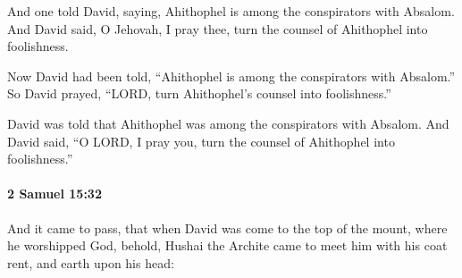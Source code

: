 			\begin{versebox}
					\item[BHS] 
					\item[ASV] And one told David, saying, Ahithophel is among the conspirators with Absalom. And David said, O Jehovah, I pray thee, turn the counsel of Ahithophel into foolishness.
					\item[NIV] Now David had been told, “Ahithophel is among the conspirators with Absalom.” So David prayed, “LORD, turn Ahithophel’s counsel into foolishness.”
					\item[NRSV] David was told that Ahithophel was among the conspirators with Absalom. And David said, “O LORD, I pray you, turn the counsel of Ahithophel into foolishness.”
			\end{versebox}

		\paragraph{2 Samuel 15:32} %
			\label{2SAMUEL-15-32}

			And it came to pass, that when David was come to the top of the mount, where he worshipped God, behold, Hushai the Archite came to meet him with his coat rent, and earth upon his head:

